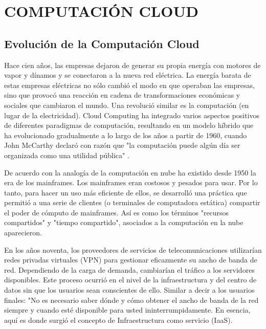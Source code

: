 \documentclass[a4paper, 12pt]{report}
\begin{document}
\chapter{COMPUTACI\'ON CLOUD}\label{cap1}
\pagestyle{plain}
\vspace*{-2em}
\begin{justify}
\end{justify}
\section{Evoluci\'on de la Computaci\'on Cloud}
\begin{justify}
Hace cien años, las empresas dejaron de generar su propia energ\'ia con motores de vapor y dínamos y se conectaron a la nueva red el\'ectrica. La energía barata de estas empresas el\'ectricas no s\'olo cambi\'o el modo en que operaban las empresas, sino que provoc\'o una reacción en cadena de transformaciones econ\'omicas y sociales que cambiaron el mundo. Una revoluci\'o similar es la computaci\'on (en lugar de la electricidad). Cloud Computing ha integrado varios aspectos positivos de diferentes paradigmas de computación, resultando en un modelo híbrido que ha evolucionado gradualmente a lo largo de los años a partir de 1960, cuando John McCarthy declar\'o con raz\'on que "la computaci\'on puede alg\'un d\'ia ser organizada como una utilidad p\'ublica" \cite{Abhishek}.

De acuerdo con \cite{Pritam} la analogía de la computación en nube ha existido desde 1950 la era de los mainframes. Los mainframes eran costosos y pesados para usar. Por lo tanto, para hacer un uso más eficiente de ellos, se desarrolló una práctica que permitió a una serie de clientes (o terminales de computadora estática) compartir el poder de cómputo de mainframes. Así es como los términos "recursos compartidos" y "tiempo compartido", asociados a la computación en la nube aparecieron.

En los años noventa, los proveedores de servicios de telecomunicaciones utilizarían redes privadas virtuales (VPN) para gestionar eficazmente su ancho de banda de red. Dependiendo de la carga de demanda, cambiarían el tráfico a los servidores disponibles. Este proceso ocurrió en el nivel de la infraestructura y del centro de datos sin que los usuarios sean conscientes de ello. Similar a decir a los usuarios finales: "No es necesario saber dónde y cómo obtener el ancho de banda de la red siempre y cuando esté disponible para usted ininterrumpidamente. En esencia, aquí es donde surgió el concepto de Infraestructura como servicio (IaaS).


\end{justify}
\end{document}
